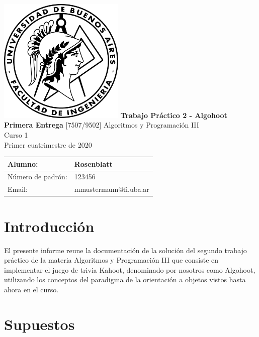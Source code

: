 \documentclass[titlepage,a4paper]{article}
\begin{document}
\begin{titlepage} %
	\hfill\includegraphics[width=6cm]{logofiuba.jpg}
    \centering
    \vfill
    \Huge \textbf{Trabajo Práctico 2 - Algohoot\\ Primera Entrega}
    \vskip2cm
    \Large [7507/9502] Algoritmos y Programación III\\
    Curso 1\\ %
    Primer cuatrimestre de 2020 
    \vfill
    \begin{tabular}{ | l | l | } %
      \hline
      Alumno: & Rosenblatt \\ \hline
      Número de padrón: & 123456 \\ \hline
      Email: & mmustermann@fi.uba.ar \\ \hline
  	\end{tabular}
    \vfill
    \vfill
\end{titlepage}

\tableofcontents %
\newpage

\section{Introducción}\label{sec:intro}
El presente informe reune la documentación de la solución del segundo trabajo práctico de la materia Algoritmos y Programación III que consiste en implementar el juego de trivia Kahoot, denominado por nosotros como Algohoot, utilizando los conceptos del paradigma de la orientación a objetos vistos hasta ahora en el curso.

\section{Supuestos}\label{sec:supuestos}
\end{document}

